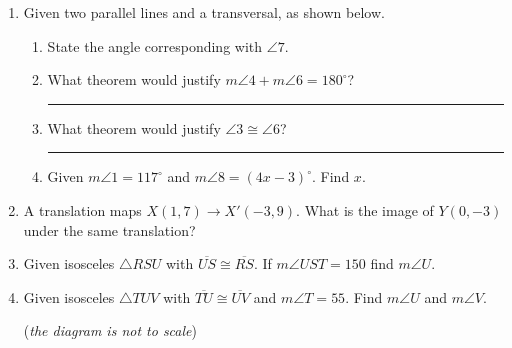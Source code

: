 \documentclass[12pt, twoside]{article}
\begin{document}
\begin{enumerate}
\newpage
\item Given two parallel lines and a transversal, as shown below.
\begin{center}
\end{center}
\begin{enumerate}
  \item State the angle corresponding with $\angle 7$. \vspace{0.5cm}
  \item What theorem would justify $m\angle 4 + m\angle 6 =180^\circ$? \rule{5cm}{0.15mm} \vspace{0.5cm}
  \item What theorem would justify $\angle 3 \cong \angle 6$? \rule{7cm}{0.15mm} \vspace{0.5cm}
  \item Given $m\angle 1 = 117^\circ$ and $m\angle 8 = (4x-3)^\circ$. Find $x$. \vspace{3.5cm}
\end{enumerate}

\item A translation maps $X(1,7) \rightarrow X'(-3,9)$. What is the image of $Y(0,-3)$ under the same translation?  \vspace{2cm}

\item Given isosceles $\triangle RSU$ with $\overline{US} \cong \overline{RS}$. If $m\angle UST=150$ find $m\angle U$.
\begin{flushright}
\end{flushright} \vspace{1cm}

\item Given isosceles $\triangle TUV$ with $\overline{TU} \cong \overline{UV}$ and $m\angle T = 55$. Find $m\angle U$ and $m\angle V$.
\begin{flushright}
  (\emph{the diagram is not to scale})\\
\end{flushright}


\end{enumerate}
\end{document}
